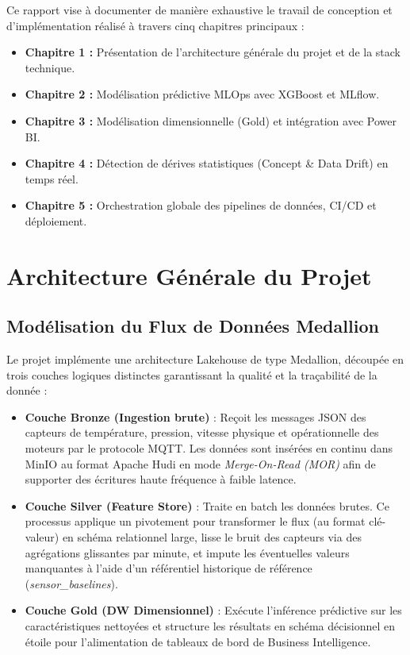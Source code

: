 \documentclass[12pt]{report}
\begin{document}
Ce rapport vise à documenter de manière exhaustive le travail de conception et d'implémentation réalisé à travers cinq chapitres principaux :
\begin{itemize}
\item \textbf{Chapitre 1 :} Présentation de l'architecture générale du projet et de la stack technique.
\item \textbf{Chapitre 2 :} Modélisation prédictive MLOps avec XGBoost et MLflow.
\item \textbf{Chapitre 3 :} Modélisation dimensionnelle (Gold) et intégration avec Power BI.
\item \textbf{Chapitre 4 :} Détection de dérives statistiques (Concept \& Data Drift) en temps réel.
\item \textbf{Chapitre 5 :} Orchestration globale des pipelines de données, CI/CD et déploiement.
\end{itemize}


\chapter{Architecture Générale du Projet}

\section{Modélisation du Flux de Données Medallion}
Le projet implémente une architecture Lakehouse de type Medallion, découpée en trois couches logiques distinctes garantissant la qualité et la traçabilité de la donnée :
\begin{itemize}
    \item \textbf{Couche Bronze (Ingestion brute)} : Reçoit les messages JSON des capteurs de température, pression, vitesse physique et opérationnelle des moteurs par le protocole MQTT. Les données sont insérées en continu dans MinIO au format Apache Hudi en mode \textit{Merge-On-Read (MOR)} afin de supporter des écritures haute fréquence à faible latence.
    \item \textbf{Couche Silver (Feature Store)} : Traite en batch les données brutes. Ce processus applique un pivotement pour transformer le flux (au format clé-valeur) en schéma relationnel large, lisse le bruit des capteurs via des agrégations glissantes par minute, et impute les éventuelles valeurs manquantes à l'aide d'un référentiel historique de référence (\textit{sensor\_baselines}).
    \item \textbf{Couche Gold (DW Dimensionnel)} : Exécute l'inférence prédictive sur les caractéristiques nettoyées et structure les résultats en schéma décisionnel en étoile pour l'alimentation de tableaux de bord de Business Intelligence.
\end{itemize}
\end{document}

